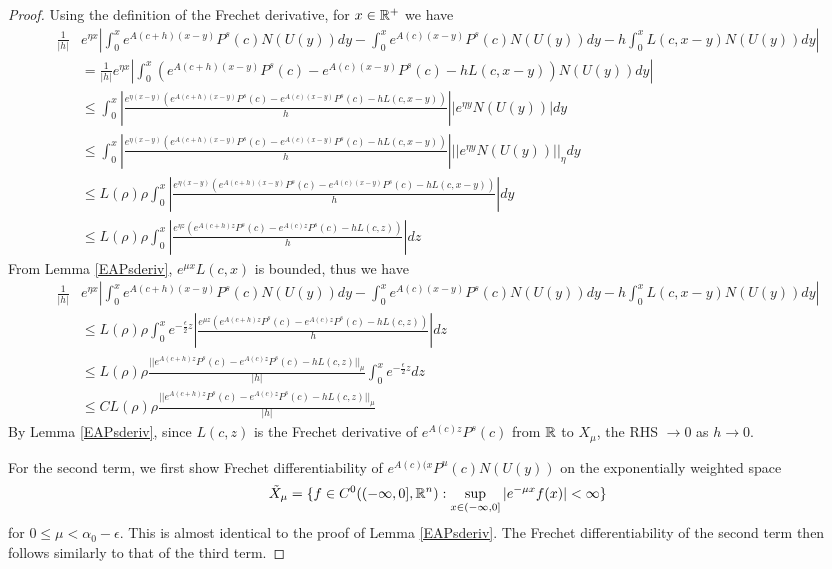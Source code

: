 \documentclass[thesis.tex]{subfiles}
\begin{document}
\begin{lemma}
\begin{proof}
Using the definition of the Frechet derivative, for $x \in \mathbb{R}^+$ we have
\begin{align*}
\frac{1}{|h|}&e^{\eta x}\left| \int_0^x e^{A(c+h)(x - y)}P^s(c) N(U(y))dy - \int_0^x e^{A(c)(x - y)}P^s(c) N(U(y))dy - h \int_0^x L(c, x - y) N(U(y)) dy \right|\\
&= \frac{1}{|h|}e^{\eta x}\left| \int_0^x \left( e^{A(c+h)(x - y)}P^s(c) - e^{A(c)(x - y)}P^s(c) - h L(c, x - y) \right) N(U(y)) dy \right| \\
&\leq \int_0^x \left| \frac{ e^{\eta(x-y)} (e^{A(c+h)(x - y)}P^s(c) - e^{A(c)(x - y)}P^s(c) - h L(c, x - y))}{h}\right| \left| e^{\eta y} N(U(y)) \right| dy \\
&\leq \int_0^x \left| \frac{ e^{\eta(x-y)} (e^{A(c+h)(x - y)}P^s(c) - e^{A(c)(x - y)}P^s(c) - h L(c, x - y))}{h}\right| || e^{\eta y} N(U(y)) ||_\eta dy \\
&\leq L(\rho)\rho \int_0^x \left| \frac{ e^{\eta(x-y)} (e^{A(c+h)(x - y)}P^s(c) - e^{A(c)(x - y)}P^s(c) - h L(c, x - y))}{h}\right| dy \\
&\leq L(\rho)\rho \int_0^x \left| \frac{ e^{\eta z} (e^{A(c+h)z }P^s(c) - e^{A(c)z }P^s(c) - h L(c, z))}{h}\right| dz
\end{align*}
From Lemma \ref{EAPsderiv}, $e^{\mu x} L(c,x)$ is bounded, thus we have 
\begin{align*}
\frac{1}{|h|}&e^{\eta x}\left| \int_0^x e^{A(c+h)(x - y)}P^s(c) N(U(y))dy - \int_0^x e^{A(c)(x - y)}P^s(c) N(U(y))dy - h \int_0^x L(c, x - y) N(U(y)) dy \right|\\
&\leq L(\rho)\rho \int_0^x e^{-\frac{\epsilon}{2}z} \left|\frac{ e^{\mu z} (e^{A(c+h)z }P^s(c) - e^{A(c)z }P^s(c) - h L(c, z))}{h}\right| dz \\
&\leq L(\rho)\rho \frac{ || e^{A(c+h)z }P^s(c) - e^{A(c)z }P^s(c) - h L(c, z)||_\mu}{|h|}  \int_0^x e^{-\frac{\epsilon}{2}z} dz \\
&\leq C L(\rho)\rho \frac{ || e^{A(c+h)z }P^s(c) - e^{A(c)z }P^s(c) - h L(c, z)||_\mu}{|h|} 
\end{align*}
By Lemma \ref{EAPsderiv}, since $L(c, z)$ is the Frechet derivative of $e^{A(c)z }P^s(c)$ from $\mathbb{R}$ to $X_\mu$, the RHS $\rightarrow 0$ as $h \rightarrow 0$.

For the second term, we first show Frechet differentiability of $e^{A(c)(x}P^u(c) N(U(y))$ on the exponentially weighted space 
\[
\tilde{X}_\mu = \{ f \in C^0((-\infty, 0], \mathbb{R}^n) : \sup_{x \in (-\infty, 0]} |e^{-\mu x} f(x)| < \infty \} 
\]
for $0 \leq \mu < \alpha_0 - \epsilon$. This is almost identical to the proof of Lemma \ref{EAPsderiv}. The Frechet differentiability of the second term then follows similarly to that of the third term.
\end{proof}
\end{lemma}
\end{document}
